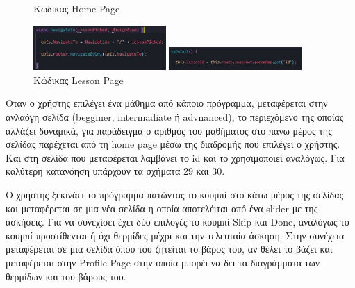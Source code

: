 \documentclass[a4paper,12pt]{article}
\begin{document}
			\begin{figure}
				\caption{Κώδικας Home Page}
				\vspace*{0.5cm}
				\includegraphics[width=0.45\textwidth]{navig}
				
				\caption{Κώδικας Lesson Page}
				\vspace*{0.5cm}
				\includegraphics[width=0.45\textwidth]{navig2}
				
			\end{figure}
			Οταν ο χρήστης επιλέγει ένα μάθημα από κάποιο πρόγραμμα, μεταφέρεται στην ανλαόγη σελίδα (begginer, intermadiate ή advnanced), το περιεχόμενο της οποίας αλλάζει δυναμικά,  για παράδειγμα ο αριθμός του μαθήματος 
			στο πάνω μέρος της σελίδας παρέχεται από τη home page μέσω της διαδρομής που επιλέγει ο χρήστης. Και στη σελίδα που μεταφέρεται λαμβάνει το id
			και το χρησιμοποιεί αναλόγως. Για καλύτερη κατανόηση υπάρχουν τα σχήματα 29 και 30.
		
			\newpage	
			Ο χρήστης ξεκινάει το πρόγραμμα πατώντας το κουμπί στο κάτω μέρος της σελίδας και μεταφέρεται σε μια νέα σελίδα η οποία αποτελέιται από ένα slider
			με της ασκήσεις. Για να συνεχίσει έχει δύο επιλογές το κουμπί Skip και Done, αναλόγως το κουμπί προστίθενται ή όχι θερμίδες μέχρι και την τελευταία
			άσκηση. Στην συνέχεια μεταφέρεται σε μια σελίδα όπου του ζητείται το βάρος του, αν θέλει το βάζει και μεταφέρεται στην Profile Page στην οποία μπορέι να 
			δει τα διαγράμματα των θερμίδων και του βάρους του.
			\vspace{.5cm}
\end{document}
